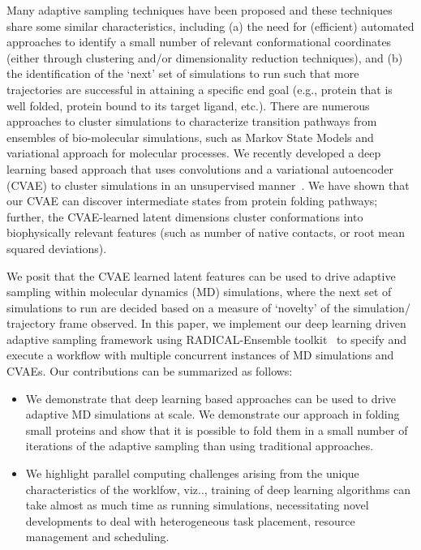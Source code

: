 \documentclass[conference,final]{IEEEtran}
\begin{document}
Many adaptive sampling techniques have been proposed and these techniques
share some similar characteristics, including (a) the need for (efficient)
automated approaches to identify a small number of relevant conformational
coordinates (either through clustering and/or dimensionality reduction
techniques), and (b) the identification of the ‘next’ set of simulations to
run such that more trajectories are successful in attaining a specific end
goal (e.g., protein that is well folded, protein bound to its target ligand,
etc.). There are numerous approaches to cluster simulations to characterize
transition pathways from ensembles of bio-molecular simulations, such as
Markov State Models and variational approach for molecular processes. We
recently developed a deep learning based approach that uses convolutions and a
variational autoencoder (CVAE) to cluster simulations in an unsupervised
manner~\cite{bhowmik2018deep}. We have shown that our CVAE can discover
intermediate states from protein folding pathways; further, the CVAE-learned
latent dimensions cluster conformations into biophysically relevant features
(such as number of native contacts, or root mean squared deviations).

We posit that the CVAE learned latent features can be used to drive adaptive
sampling within molecular dynamics (MD) simulations, where the next set of
simulations to run are decided based on a measure of ‘novelty’ of the
simulation/ trajectory frame observed. In this paper, we implement our deep
learning driven adaptive sampling framework using RADICAL-Ensemble
toolkit~\cite{balasubramanian2018harnessing} to specify and execute a workflow
with multiple concurrent instances of MD simulations and CVAEs. Our
contributions can be summarized as follows:
\begin{itemize}
\item We demonstrate that deep learning based approaches can be used to drive adaptive MD simulations at scale. We demonstrate our approach in folding small proteins and show that it is possible to fold them in a small number of iterations of the adaptive sampling than using traditional approaches. 
\item We highlight parallel computing challenges arising from the
unique characteristics of the worklfow, viz.., training of deep learning
algorithms can take almost as much time as running simulations, necessitating
novel developments to deal with heterogeneous task placement, resource
management and scheduling.
\end{itemize}
\end{document}
